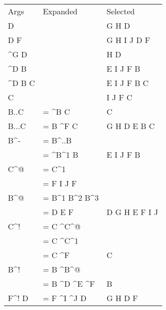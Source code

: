 {\scriptsize
\begin{tabular}{l l l}
    Args & Expanded & Selected  \\
    D & &                           G H D \\
    D F & &                         G H I J D F \\
    \textasciicircum G D & &                        H D \\
    \textasciicircum D B & &                        E I J F B \\
    \textasciicircum D B C & &                      E I J F B C \\
    C & &                           I J F C \\
    B..C &      = \textasciicircum B C &            C \\
    B...C &     = B \textasciicircum F C &          G H D E B C \\
    B\textasciicircum - &       = B\textasciicircum ..B \\
    &           = \textasciicircum B\textasciicircum 1 B &            E I J F B \\
    C\textasciicircum @ &       = C\textasciicircum 1 \\
    &           = F                 I J F \\
    B\textasciicircum @ &       = B\textasciicircum 1 B\textasciicircum 2 B\textasciicircum 3 \\
    &           = D E F &           D G H E F I J \\
    C\textasciicircum ! &       = C \textasciicircum C\textasciicircum @ \\
    &           = C \textasciicircum C\textasciicircum 1 \\
    &           = C \textasciicircum F &            C \\
    B\textasciicircum ! &       = B \textasciicircum B\textasciicircum @ \\
    &           = B \textasciicircum D \textasciicircum E \textasciicircum F &      B \\
    F\textasciicircum ! D &     = F \textasciicircum I \textasciicircum J D &       G H D F \\
\end{tabular}}


\ \\